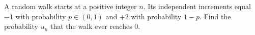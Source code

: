 A random walk starts at a positive integer $n$. Its independent increments equal $-1$ with probability $p\in(0,1)$ and $+2$ with probability $1-p$. Find the probability $u_n$ that the walk ever reaches 0.
